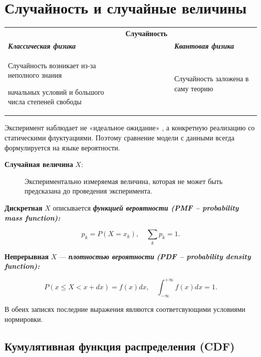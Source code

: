 \documentclass[
  russian,
  letterpaper,
]{scrbook}
\newcounter{none} %
\begin{document}
\section{Случайность и случайные
величины}\label{ux441ux43bux443ux447ux430ux439ux43dux43eux441ux442ux44c-ux438-ux441ux43bux443ux447ux430ux439ux43dux44bux435-ux432ux435ux43bux438ux447ux438ux43dux44b}

{\def\LTcaptype{none} %
\begin{longtable}[]{@{}
  >{\centering\arraybackslash}p{}
  >{\centering\arraybackslash}p{}
  >{\centering\arraybackslash}p{}@{}}
\toprule\noalign{}
\endhead
\bottomrule\noalign{}
\endlastfoot
& \textbf{Случайность} & \\
\textbf{\emph{Классическая физика}} & & \textbf{\emph{Квантовая
физика}} \\
Случайность возникает из-за неполного знания

начальных условий и большого числа степеней свободы & & Случайность
заложена в саму теорию \\
\end{longtable}
}

Эксперимент наблюдает не «идеальное ожидание» , а конкретную реализацию
со статическими флуктуациями. Поэтому сравнение модели с данными всегда
формулируется на языке вероятности.

\begin{description}
\item[\textbf{Случайная величина} \(X:\)]
Экспериментально измеряемая величина, которая не может быть предсказана
до проведения эксперимента.
\end{description}

\textbf{Дискретная} \(X\) описывается \textbf{\emph{функцией вероятности
(PMF -- probability mass function):}}

\[p_k=P(X=x_k), \quad \sum_k p_k=1.\]

\textbf{Непрерывная} \(X\) --- \textbf{\emph{плотностью вероятности}}
\textbf{\emph{(PDF -- probability density function):}}

\[P(x\leq X<x+dx)=f(x)dx, \quad \int_{-\infty}^{+\infty}f(x)dx=1.\]

В обеих записях последние выражения являются соответсвующими условиями
нормировки.

\subsection{Кумулятивная функция распределения
(CDF)}\label{ux43aux443ux43cux443ux43bux44fux442ux438ux432ux43dux430ux44f-ux444ux443ux43dux43aux446ux438ux44f-ux440ux430ux441ux43fux440ux435ux434ux435ux43bux435ux43dux438ux44f-cdf}
\end{document}
